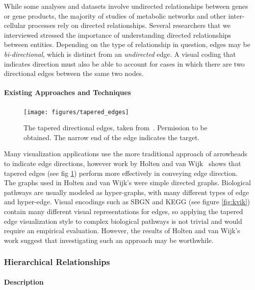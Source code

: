 While some analyses and datasets involve undirected relationships between genes or gene products, the majority of studies of metabolic networks and other inter-cellular processes rely on directed relationships.
Several researchers that we interviewed stressed the importance of understanding directed relationships between entities.
Depending on the type of relationship in question, edges may be \textit{bi-directional}, which is distinct from an \textit{undirected} edge.
A visual coding that indicates direction must also be able to account for cases in which there are two directional edges between the same two nodes.

\paragraph{Existing Approaches and Techniques}

\begin{figure}[htb]
  \centering
  \texttt{[image: figures/tapered\_edges]}
  \caption{\label{fig:tapered_edges} The tapered directional edges, taken from~\cite{Holten2009}. Permission to be obtained. The narrow end of the edge indicates the target.}
\end{figure}

Many visualization applications use the more traditional approach of arrowheads to indicate edge directions, however work by Holten and van Wijk~\cite{Holten2009} shows that tapered edges (see fig \ref{fig:tapered_edges}) perform more effectively in conveying edge direction. The graphs used in Holten and van Wijk's were simple directed graphs. Biological pathways are usually modeled as hyper-graphs, with many different types of edge and hyper-edge. Visual encodings such as SBGN and KEGG (see figure \ref{fig:kvik}) contain many different visual representations for edges, so applying the tapered edge visualization style to complex biological pathways is not trivial and would require an empirical evaluation. However, the results of Holten and van Wijk's work suggest that investigating such an approach may be worthwhile.

\subsubsection{Hierarchical Relationships}

\paragraph{Description}

